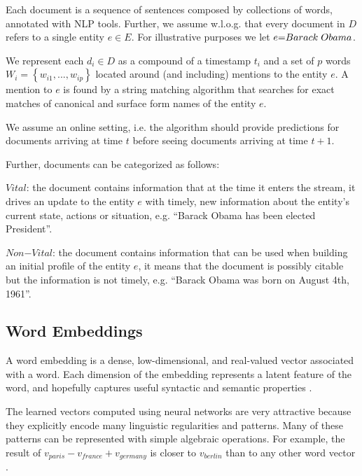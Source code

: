\documentclass{article}
\begin{document}
Each document is a sequence of sentences composed by collections of words, annotated with NLP tools.
Further, we assume w.l.o.g. that every document in $D$ refers to a single entity $e \in E$. For illustrative purposes we let $e\mathord{=}Barack\hspace{1mm}Obama$.

We represent each $d_i \in D$ as a compound of a timestamp $t_i$ and a set of $p$ words $W_i = \left\{ {w_{i1}, ..., w_{ip}}\right\}$ located around (and including) mentions to the entity $e$. A mention to $e$ is found by a string matching algorithm that searches for exact matches of canonical and surface form names of the entity $e$.

We assume an online setting, i.e. the algorithm should provide predictions for documents arriving at time $t$ before seeing documents arriving at time $t+1$.

Further, documents can be categorized as follows:

\begin{itemize*}
    \item $Vital$: the document contains information that at the time it enters the stream, it drives an update to the entity $e$ with timely, new information about the entity's current state, actions or situation, e.g. ``Barack Obama has been elected President''.
    \item $Non\mathord{-}Vital$: the document contains information that can be used when building an initial profile of the entity $e$, it means that the document is possibly citable but the information is not timely, e.g. ``Barack Obama was born on August 4th, 1961''.
\end{itemize*}

\subsection{Word Embeddings}
\label{emb}

A word embedding is a dense, low-dimensional, and real-valued vector associated with a word. Each dimension of the embedding represents a latent feature of the word, and hopefully captures useful syntactic and semantic properties \cite{Turian10wordrepresentations}.

The learned vectors computed using neural networks are very attractive because they explicitly encode many linguistic regularities and patterns. Many of these patterns can be represented with simple algebraic operations. For example, the result of $v_{paris} - v_{france} + v_{germany}$ is closer to $v_{berlin}$ than to any other word vector \cite{mikolovChen,mikolovYih}.
\end{document}
